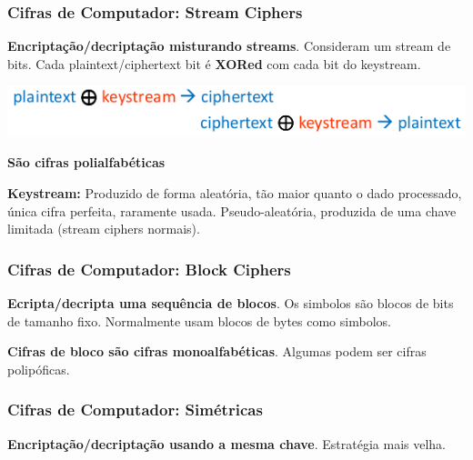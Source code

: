 \documentclass{article}
\begin{document}
\subsubsection{Cifras de Computador: Stream Ciphers}

\begin{flushleft}
  \textbf{Encriptação/decriptação misturando streams}. Consideram
  um stream de bits. Cada plaintext/ciphertext bit é \textbf{XORed}
  com cada bit do keystream.
  
  \begin{center}
    \includegraphics[scale=0.3]{70}
  \end{center}

  \vspace{2mm}

  \textbf{São cifras polialfabéticas}

  \vspace{2mm}

  \textbf{Keystream:} Produzido de forma aleatória, tão maior quanto o dado
  processado, única cifra perfeita, raramente usada. Pseudo-aleatória, produzida
  de uma chave limitada (stream ciphers normais).
\end{flushleft}

\subsubsection{Cifras de Computador: Block Ciphers}

\begin{flushright}
  \textbf{Ecripta/decripta uma sequência de blocos}. Os simbolos são blocos de bits
  de tamanho fixo. Normalmente usam blocos de bytes como simbolos.

  \vspace{2mm}

  \textbf{Cifras de bloco são cifras monoalfabéticas}. Algumas podem ser
  cifras polipóficas.
\end{flushright}

\subsubsection{Cifras de Computador: Simétricas}

\begin{flushleft}
  \textbf{Encriptação/decriptação usando a mesma chave}. Estratégia mais velha.
\end{flushleft}
\end{document}
